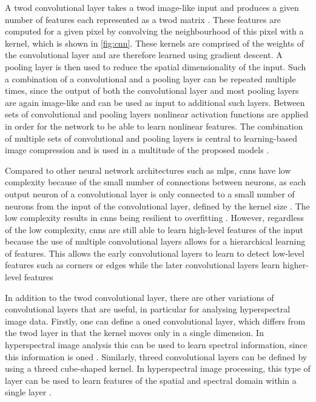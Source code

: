 A \ac{twod} convolutional layer takes a \ac{twod} image-like input and produces a given number of features each represented as a \ac{twod} matrix \citep{gu_recent_2018}. These features are computed for a given pixel by convolving the neighbourhood of this pixel with a kernel, which is shown in \autoref{fig:cnn}. These kernels are comprised of the weights of the convolutional layer and are therefore learned using gradient descent. A pooling layer is then used to reduce the spatial dimensionality of the input. Such a combination of a convolutional and a pooling layer can be repeated multiple times, since the output of both the convolutional layer and most pooling layers are again image-like and can be used as input to additional such layers. Between sets of convolutional and pooling layers nonlinear activation functions are applied in order for the network to be able to learn nonlinear features. The combination of multiple sets of convolutional and pooling layers  is central to learning-based image compression and is used in a multitude of the proposed models \citep{balle_end--end_2017,balle_variational_2018,kuester_1d-convolutional_2021,kuester_transferability_2022,guo_learned_2021}.

Compared to other neural network architectures such as \acp{mlp}, \acp{cnn} have low complexity because of the small number of connections between neurons, as each output neuron of a convolutional layer is only connected to a small number of neurons from the input of the convolutional layer, defined by the kernel size \citep{gu_recent_2018}. The low complexity results in \acp{cnn} being resilient to overfitting \citep{oshea_introduction_2015,gu_recent_2018}. However, regardless of the low complexity, \acp{cnn} are still able to learn high-level features of the input because the use of multiple convolutional layers allows for a hierarchical learning of features. This allows the early convolutional layers to learn to detect low-level features such as corners or edges while the later convolutional layers learn higher-level features \citep{gu_recent_2018}

In addition to the \ac{twod} convolutional layer, there are other variations of convolutional layers that are useful, in particular for analysing hyperspectral image data. Firstly, one can define a \ac{oned} convolutional layer, which differs from the \ac{twod} layer in that the kernel moves only in a single dimension. In hyperspectral image analysis this can be used to learn spectral information, since this information is \ac{oned} \citep{kuester_1d-convolutional_2021,kuester_transferability_2022}. Similarly, \ac{threed} convolutional layers can be defined by using a \ac{threed} cube-shaped kernel. In hyperspectral image processing, this type of layer can be used to learn features of the spatial and spectral domain within a single layer \citep{guo_learned_2021}.

